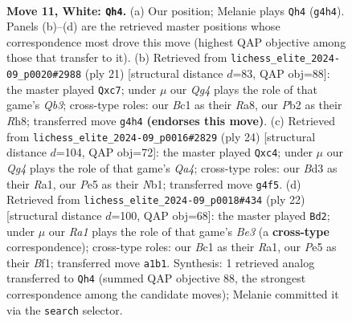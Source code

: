 \documentclass[11pt]{article}
\begin{document}
\clearpage

\begin{figure}[p]\centering
\begin{subfigure}{0.46\textwidth}\centering
\resizebox{\linewidth}{!}{%
\newchessgame
\chessboard[
  setfen={r1b1kb1r/pp1n1ppp/2n1p3/q2pP3/3P2Q1/3B1PP1/PP1N3P/R1B1K1NR w KQ - 1 11},
  showmover=false,
  pgfstyle=straightmove, color=movearrow, markmove={g4-h4}
]}
\caption{}
\end{subfigure}\hfill
\begin{subfigure}{0.46\textwidth}\centering
\resizebox{\linewidth}{!}{%
\newchessgame
\chessboard[
  setfen={r3kb1r/p1P2pp1/1qn2n1p/3p4/Q3p3/2N1P2P/PP1P1P1P/R1B1KB1R b KQkq - 0 11},
  showmover=false,
  pgfstyle=straightmove, color=movearrow, markmove={b6-c7}
]}
\caption{}
\end{subfigure}
\\[4pt]
\begin{subfigure}{0.46\textwidth}\centering
\resizebox{\linewidth}{!}{%
\newchessgame
\chessboard[
  setfen={r1b1kb1r/pp3ppp/1qp1n3/8/Q1p1B3/4P1P1/PP3P1P/RNBR2K1 w kq - 2 13},
  showmover=false,
  pgfstyle=straightmove, color=movearrow, markmove={a4-c4}
]}
\caption{}
\end{subfigure}\hfill
\begin{subfigure}{0.46\textwidth}\centering
\resizebox{\linewidth}{!}{%
\newchessgame
\chessboard[
  setfen={r1b2rk1/pp1p1pbp/2n3p1/q1PQ4/4p3/P1N1B3/1PP2PPP/R3KB1R w KQ - 0 12},
  showmover=false,
  pgfstyle=straightmove, color=movearrow, markmove={e3-d2}
]}
\caption{}
\end{subfigure}
\caption{\textbf{Move 11, White: \texttt{Qh4}.} (a) Our position; Melanie plays \texttt{Qh4} (\texttt{g4h4}). Panels (b)--(d) are the retrieved master positions whose correspondence most drove this move (highest QAP objective among those that transfer to it). (b) Retrieved from \texttt{lichess\_elite\_2024-09\_p0020\#2988} (ply 21) [structural distance $d$=83, QAP obj=88]: the master played \texttt{Qxc7}; under $\mu$ our \emph{Qg4} plays the role of that game's \emph{Qb3}; cross-type roles: our \emph{B}c1 as their \emph{R}a8, our \emph{P}b2 as their \emph{R}h8; transferred move \texttt{g4h4} \textbf{(endorses this move)}. (c) Retrieved from \texttt{lichess\_elite\_2024-09\_p0016\#2829} (ply 24) [structural distance $d$=104, QAP obj=72]: the master played \texttt{Qxc4}; under $\mu$ our \emph{Qg4} plays the role of that game's \emph{Qa4}; cross-type roles: our \emph{B}d3 as their \emph{R}a1, our \emph{P}e5 as their \emph{N}b1; transferred move \texttt{g4f5}. (d) Retrieved from \texttt{lichess\_elite\_2024-09\_p0018\#434} (ply 22) [structural distance $d$=100, QAP obj=68]: the master played \texttt{Bd2}; under $\mu$ our \emph{Ra1} plays the role of that game's \emph{Be3} (a \textbf{cross-type} correspondence); cross-type roles: our \emph{B}c1 as their \emph{R}a1, our \emph{P}e5 as their \emph{B}f1; transferred move \texttt{a1b1}. Synthesis: 1 retrieved analog transferred to \texttt{Qh4} (summed QAP objective 88, the strongest correspondence among the candidate moves); Melanie committed it via the \texttt{search} selector.}
\label{fig:thought-m20}
\end{figure}
\end{document}
